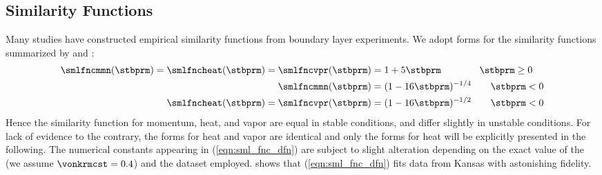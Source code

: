 \documentclass[12pt,twoside]{book}
\begin{document}
\subsection[Similarity Functions]{Similarity Functions}
Many studies have constructed empirical similarity functions from 
boundary layer experiments.
We adopt forms for the similarity functions summarized by
\cite[p.~71]{Bru82} and \cite{ZZD98}:
\begin{subequations}
\label{eqn:sml_fnc_dfn}
\begin{align}
\label{eqn:sml_fnc_dfn_stb}
\smlfncmmn(\stbprm) = \smlfncheat(\stbprm) = \smlfncvpr(\stbprm) & = 
1 + 5 \stbprm \qquad \qquad \stbprm \ge 0 \\
\label{eqn:sml_fnc_dfn_mmn_uns}
\smlfncmmn(\stbprm) & = 
( 1 - 16 \stbprm )^{-1/4} \qquad \stbprm < 0 \\
\label{eqn:sml_fnc_dfn_heat_uns}
\smlfncheat(\stbprm) = \smlfncvpr(\stbprm) & = 
( 1 - 16 \stbprm )^{-1/2} \qquad \stbprm < 0
\end{align}
\end{subequations}
Hence the similarity function for momentum, heat, and vapor are equal  
in stable conditions, and differ slightly in unstable conditions.
For lack of evidence to the contrary, the forms for heat and vapor are
identical and only the forms for heat will be explicitly presented
in the following.
The numerical constants appearing in (\ref{eqn:sml_fnc_dfn}) are
subject to slight alteration depending on the exact value of the
 (we assume $\vonkrmcst = 0.4$) and the
dataset employed.  
\cite[pp.~162--165]{Ary88} shows that (\ref{eqn:sml_fnc_dfn}) fits
data from Kansas with astonishing fidelity.
\end{document}
